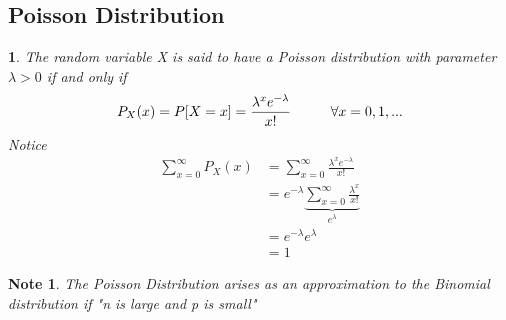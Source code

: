 \documentclass[11pt]{article}
\newtheorem*{note}{Note}
\newtheorem{definition}{\framebox{DEF}}[section]
\newcommand\tab[1][1cm]{\hspace*{#1}}
\begin{document}
        \subsection{Poisson Distribution}
            \begin{definition}
                The random variable X is said to have a Poisson distribution with parameter $\lambda > 0$ if and only if $$P_X(x) = P[X=x] = \frac{\lambda^x e^{-\lambda}}{x!} \tab \forall x = 0,1,...$$
                Notice
                \begin{align*}
                    \sum_{x=0}^{\infty} P_X(x)  &= \sum_{x=0}^{\infty}  \frac{\lambda^x e^{-\lambda}}{x!} \\
                                                &= e^{-\lambda} \underbrace{\sum_{x=0}^{\infty} \frac{\lambda^x}{x!}}_{e^{\lambda}} \\
                                                &= e^{-\lambda}e^{\lambda} \\
                                                &= 1
                \end{align*}
            \end{definition}
            \begin{note}
                The Poisson Distribution arises as an approximation to the Binomial distribution if "n is large and p is small" 
            \end{note}
\end{document}
